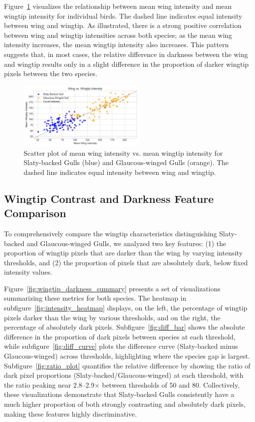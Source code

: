 \documentclass[a4paper,12pt]{report}
\begin{document}
Figure~\ref{fig:wing_vs_wingtip_intensity} visualizes the relationship between mean wing intensity and mean wingtip intensity for individual birds. The dashed line indicates equal intensity between wing and wingtip. As illustrated, there is a strong positive correlation between wing and wingtip intensities across both species; as the mean wing intensity increases, the mean wingtip intensity also increases. This pattern suggests that, in most cases, the relative difference in darkness between the wing and wingtip results only in a slight difference in the proportion of darker wingtip pixels between the two species.

\begin{figure}[H]
    \centering
    \includegraphics[width=0.55\textwidth]{images/REPORT_IMAGES_INTENSITY/I2/clusterwingwingtip.png}
    \caption{Scatter plot of mean wing intensity vs. mean wingtip intensity for Slaty-backed Gulls (blue) and Glaucous-winged Gulls (orange). The dashed line indicates equal intensity between wing and wingtip.}
    \label{fig:wing_vs_wingtip_intensity}
\end{figure}

\subsection{Wingtip Contrast and Darkness Feature Comparison}

To comprehensively compare the wingtip characteristics distinguishing Slaty-backed and Glaucous-winged Gulls, we analyzed two key features: (1) the proportion of wingtip pixels that are darker than the wing by varying intensity thresholds, and (2) the proportion of pixels that are absolutely dark, below fixed intensity values.

Figure~\ref{fig:wingtip_darkness_summary} presents a set of visualizations summarizing these metrics for both species. The heatmap in subfigure~\ref{fig:intensity_heatmap} displays, on the left, the percentage of wingtip pixels darker than the wing by various thresholds, and on the right, the percentage of absolutely dark pixels. Subfigure~\ref{fig:diff_bar} shows the absolute difference in the proportion of dark pixels between species at each threshold, while subfigure~\ref{fig:diff_curve} plots the difference curve (Slaty-backed minus Glaucous-winged) across thresholds, highlighting where the species gap is largest. Subfigure~\ref{fig:ratio_plot} quantifies the relative difference by showing the ratio of dark pixel proportions (Slaty-backed/Glaucous-winged) at each threshold, with the ratio peaking near 2.8--2.9$\times$ between thresholds of 50 and 80. Collectively, these visualizations demonstrate that Slaty-backed Gulls consistently have a much higher proportion of both strongly contrasting and absolutely dark pixels, making these features highly discriminative.
\end{document}
